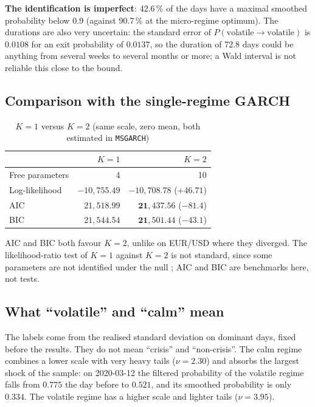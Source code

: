 \documentclass[12pt,a4paper]{article}
\begin{document}
\textbf{The identification is imperfect}: 42.6\,\% of the days have a maximal smoothed probability below 0.9 (against 90.7\,\% at the micro-regime optimum). The durations are also very uncertain: the standard error of $P(\text{volatile}\to\text{volatile})$ is $0.0108$ for an exit probability of $0.0137$, so the duration of 72.8 days could be anything from several weeks to several months or more; a Wald interval is not reliable this close to the bound.

\subsection{Comparison with the single-regime GARCH}

\begin{table}[H]
	\centering
	\caption{$K=1$ versus $K=2$ (same scale, zero mean, both estimated in \texttt{MSGARCH})}
	\label{tab:ms-ic}
	\begin{tabular}{lrr}
		\toprule
		& $K=1$ & $K=2$ \\
		\midrule
		Free parameters & 4 & 10 \\
		Log-likelihood & $-10{,}755.49$ & $-10{,}708.78$ ($+46.71$) \\
		AIC & $21{,}518.99$ & $\mathbf{21{,}437.56}$ ($-81.4$) \\
		BIC & $21{,}544.54$ & $\mathbf{21{,}501.44}$ ($-43.1$) \\
		\bottomrule
	\end{tabular}
\end{table}

AIC and BIC both favour $K=2$, unlike on EUR/USD where they diverged. The likelihood-ratio test of $K=1$ against $K=2$ is not standard, since some parameters are not identified under the null \citep{hansen1992,garcia1998}; AIC and BIC are benchmarks here, not tests.

\subsection{What ``volatile'' and ``calm'' mean}
\label{sec:ms-labels}

The labels come from the realised standard deviation on dominant days, fixed before the results. They do not mean ``crisis'' and ``non-crisis''. The calm regime combines a lower scale with very heavy tails ($\nu=2.30$) and absorbs the largest shock of the sample: on 2020-03-12 the filtered probability of the volatile regime falls from $0.775$ the day before to $0.521$, and its smoothed probability is only $0.334$. The volatile regime has a higher scale and lighter tails ($\nu=3.95$).
\end{document}
